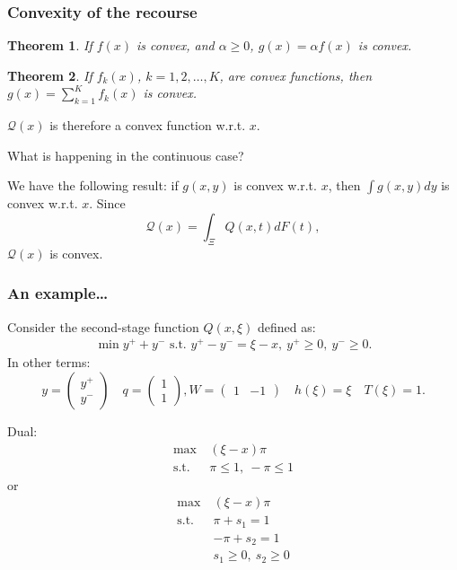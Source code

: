 \documentclass{beamer}
\newtheorem{theo}{Theorem}
\begin{document}
\begin{frame}
\frametitle{Convexity of the recourse}

\begin{theo}
If $f(x)$ is convex, and $\alpha \geq 0$, $g(x) = \alpha f(x)$ is convex.
\end{theo}

\begin{theo}
If $f_k(x)$, $k = 1,2,\ldots,K$, are convex functions, then $g(x) = \sum_{k=1}^K f_k(x)$ is convex.
\end{theo}

$\mathcal{Q}(x)$ is therefore a convex function w.r.t. $x$.

\mbox{}

What is happening in the continuous case?

\mbox{}

We have the following result: if $g(x,y)$ is convex w.r.t. $x$, then $\int g(x,y)dy$ is convex w.r.t. $x$. Since
\[
\mathcal{Q}(x) = \int_{\Xi} Q(x,t) dF(t),
\]
{\red $\mathcal{Q}(x)$ is convex}.

\end{frame}

\begin{frame}
\frametitle{An example\ldots}

Consider the second-stage function $Q(x,\xi)$ defined as:
\begin{align*}
\min y^++y^- \mbox{ s.t. } y^+-y^- = \xi - x,\ y^+ \geq 0,\ y^- \geq 0.
\end{align*}
In other terms:
\[
y = \begin{pmatrix} y^+ \\ y^- \end{pmatrix} \quad q = \begin{pmatrix}
    1 \\ 1 \end{pmatrix}, W = \begin{pmatrix} 1 & -1 \end{pmatrix}
  \quad h(\xi) = \xi \quad T(\xi) = 1.
\]

\mbox{}

Dual:
\begin{align*}
\max\ & (\xi-x)\pi \\
\mbox{s.t. } & \pi \leq 1,\ -\pi \leq 1
\end{align*}
or
\begin{align*}
\max\ & (\xi-x)\pi \\
\mbox{s.t. } & \pi + s_1 = 1 \\
& -\pi + s_2 = 1 \\
& s_1 \geq 0,\ s_2 \geq 0
\end{align*}

\end{frame}
\end{document}

